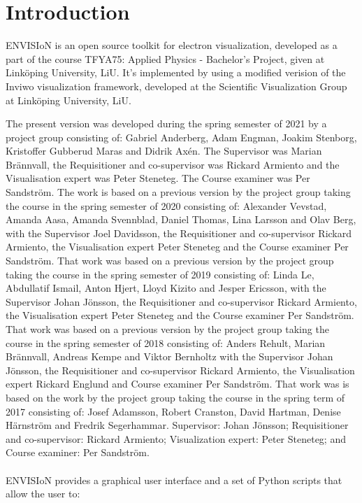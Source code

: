 \section{Introduction}
\label{ch:intro}
ENVISIoN is an open source toolkit for electron visualization, developed as a part of the course TFYA75: Applied Physics - Bachelor's Project, given at Linköping University, LiU. It's implemented by using a modified verision of the Inviwo visualization framework, developed at the Scientific Visualization Group at Linköping University, LiU.

The present version was developed during the spring semester of 2021 by a project group consisting of: Gabriel Anderberg, Adam Engman, Joakim Stenborg, Kristoffer Gubberud Maras and Didrik Axén. The Supervisor was Marian Brännvall, the Requisitioner and co-supervisor was Rickard Armiento and the Visualisation expert was Peter Steneteg. The Course examiner was Per Sandström. The work is based on a previous version by the project group taking the course in the spring semester of 2020 consisting of: Alexander Vevstad, Amanda Aasa, Amanda Svennblad, Daniel Thomas, Lina Larsson and Olav Berg, with the Supervisor Joel Davidsson, the Requisitioner and co-supervisor Rickard Armiento, the Visualisation expert Peter Steneteg and the Course examiner Per Sandström. That work was based on a previous version by the project group taking the course in the spring semester of 2019 consisting of: Linda Le, Abdullatif Ismail, Anton Hjert, Lloyd Kizito and Jesper Ericsson, with the Supervisor Johan Jönsson, the Requisitioner and co-supervisor Rickard Armiento, the Visualisation expert Peter Steneteg and the Course examiner Per Sandström. That work was based on a previous version by the project group taking the course in the spring semester of 2018 consisting of: Anders Rehult, Marian Brännvall, Andreas Kempe and Viktor Bernholtz with the Supervisor Johan Jönsson, the Requisitioner and co-supervisor Rickard Armiento, the Visualisation expert Rickard Englund and Course examiner Per Sandström. That work was is based on the work by the project group taking the course in the spring term of 2017 consisting of: Josef Adamsson, Robert Cranston, David Hartman, Denise Härnström and Fredrik Segerhammar. Supervisor: Johan Jönsson; Requisitioner and co-supervisor: Rickard Armiento; Visualization expert: Peter Steneteg; and Course examiner: Per Sandström.
\\\\
ENVISIoN provides a graphical user interface and a set of Python scripts that allow the user to:
